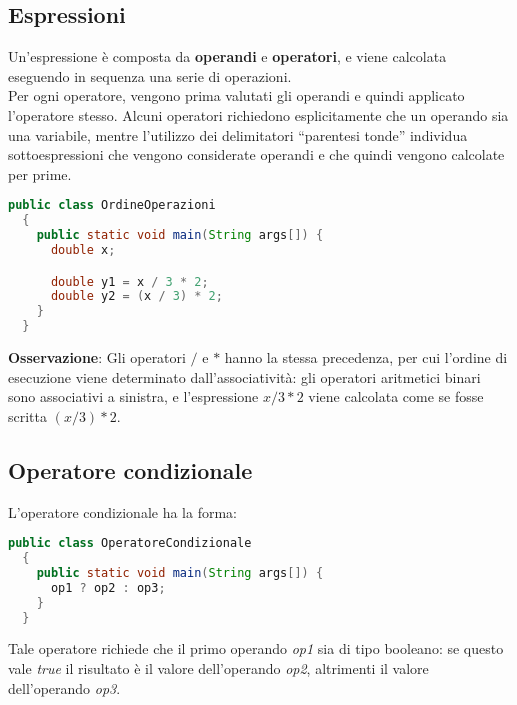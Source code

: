 \documentclass[a4paper]{extarticle}
\newcommand{\quotes}[1]{``#1''}
\begin{document}
\subsection{Espressioni}
Un’espressione è composta da \textbf{operandi} e \textbf{operatori}, e viene calcolata eseguendo in sequenza una serie di operazioni.\\
Per ogni operatore, vengono prima valutati gli operandi e quindi applicato l’operatore stesso. Alcuni operatori richiedono esplicitamente che un operando sia una variabile, mentre l’utilizzo dei delimitatori \quotes{parentesi tonde} individua sottoespressioni che vengono considerate operandi e che quindi vengono calcolate per prime.

\vspace{1em}
\noindent
\begin{lstlisting}[language=Java, caption=Ordine delle operazioni in Java]
  public class OrdineOperazioni
  {
    public static void main(String args[]) {
      double x;

      double y1 = x / 3 * 2;
      double y2 = (x / 3) * 2;
    }
  }
\end{lstlisting}
\vspace{1em}

\noindent
\textbf{Osservazione}: Gli operatori $/$ e $\ast$ hanno la stessa precedenza, per cui l'ordine di esecuzione viene determinato dall’associatività: gli operatori aritmetici binari sono associativi a sinistra, e l'espressione $x / 3 * 2$ viene calcolata come se fosse scritta $(x / 3) * 2$.

\vspace{1em}
\subsection{Operatore condizionale}
L’operatore condizionale ha la forma:

\vspace{1em}
\noindent
\begin{lstlisting}[language=Java, caption=Operatore condizionale in Java]
  public class OperatoreCondizionale
  {
    public static void main(String args[]) {
      op1 ? op2 : op3;
    }
  }
\end{lstlisting}
\vspace{1em}

\noindent
Tale operatore richiede che il primo operando \emph{op1} sia di tipo booleano: se questo vale \emph{true} il risultato è il valore dell’operando \emph{op2}, altrimenti il valore dell’operando \emph{op3}.
\end{document}
